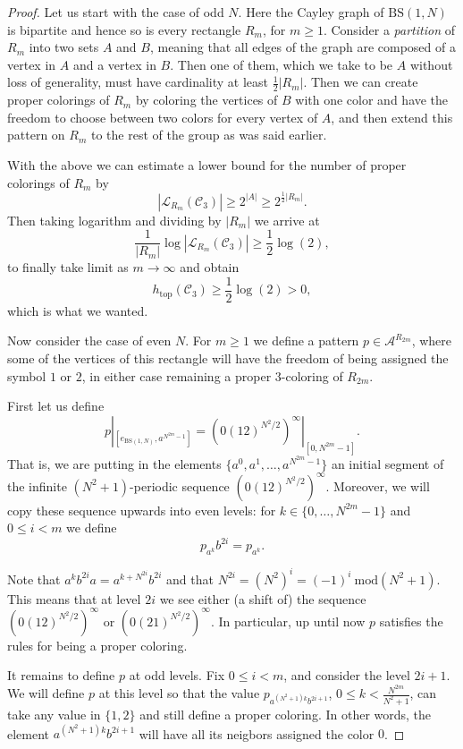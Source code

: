 \documentclass[letterpaper,11pt,reqno]{amsart}
\theoremstyle{plain}
\theoremstyle{definition}
\theoremstyle{cupremark}
\newcommand{\BS}[1][N]{\mathrm{BS}(1,#1)}
\def\htop{h_{\mathrm{top}}}
\begin{document}
\begin{proof}
	Let us start with the case of odd $N$. Here the Cayley graph of $\BS$ is bipartite and hence so is every rectangle $R_m$, for $m\ge 1$. Consider a \textit{partition} of $R_m$ into two sets $A$ and $B$, meaning that all edges of the graph are composed of a vertex in $A$ and a vertex in $B$. Then one of them, which we take to be $A$ without loss of generality, must have cardinality at least $\frac{1}{2}|R_m|$. Then we can create proper colorings of $R_m$ by coloring the vertices of $B$ with one color and have the freedom to choose between two colors for every vertex of $A$, and then extend this pattern on $R_m$ to the rest of the group as was said earlier.
	
	With the above we can estimate a lower bound for the number of proper colorings of $R_m$ by
	$$
	|\mathcal{L}_{R_m}(\mathcal{C}_3)|\ge 2^{|A|}\ge 2^{\frac{1}{2}|R_m|}.
	$$
	Then taking logarithm and dividing by $|R_m|$ we arrive at
	$$
	\frac{1}{|R_m|}\log |\mathcal{L}_{R_m}(\mathcal{C}_3)| \ge \frac{1}{2}\log (2),
	$$
	to finally take limit as $m\to \infty$ and obtain
	$$
	\htop(\mathcal{C}_3)\ge \frac{1}{2}\log(2)>0,
	$$
	which is what we wanted.
	
	
	Now consider the case of even $N$. For $m\ge 1$ we define a pattern $p\in \mathcal{A}^{R_{2m}}$, where some of the vertices of this rectangle will have the freedom of being assigned the symbol $1$ or $2$, in either case remaining a proper $3$-coloring of $R_{2m}$.
	
	First let us define 
	$$
	p|_{[e_{\BS},a^{N^{2m}-1}]}=(0(12)^{N^2/2})^{\infty}|_{[0,N^{2m}-1]}.
	$$
	That is, we are putting in the elements $\{a^{0},a^{1},\ldots,a^{N^{2m}-1}\}$ an initial segment of the infinite $(N^2+1)$-periodic sequence $(0(12)^{N^2/2})^{\infty}$. Moreover, we will copy these sequence upwards into even levels: for $k\in \{0,\ldots,N^{2m}-1\}$ and $0\le i<m$ we define
	$$
	p_{a^{k}}b^{2i}=p_{a^k}.
	$$
	
	Note that $a^kb^{2i}a=a^{k+N^{2i}}b^{2i}$ and that $N^{2i}=(N^{2})^i=(-1)^{i}\ \mathrm{mod}(N^2+1)$. This means that at level $2i$ we see either (a shift of) the sequence $(0(12)^{N^2/2})^{\infty}$ or $(0(21)^{N^2/2})^{\infty}$. In particular, up until now $p$ satisfies the rules for being a proper coloring.
	
	It remains to define $p$ at odd levels. Fix $0\le i<m$, and consider the level $2i+1$. We will define $p$ at this level so that the value $p_{a^{(N^2+1)k}b^{2i+1}}$, $0\le k<\frac{N^{2m}}{N^2+1}$, can take any value in $\{1,2\}$ and still define a proper coloring. In other words, the element $a^{(N^2+1)k}b^{2i+1}$ will have all its neigbors assigned the color $0$.
	

\end{proof}
\end{document}
